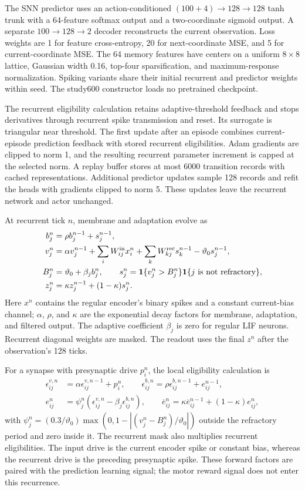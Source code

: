 The SNN predictor uses an action-conditioned $(100+4)\to128\to128$ tanh trunk with a 64-feature softmax output and a two-coordinate sigmoid output. A separate $100\to128\to2$ decoder reconstructs the current observation. Loss weights are 1 for feature cross-entropy, 20 for next-coordinate MSE, and 5 for current-coordinate MSE. The 64 memory features have centers on a uniform $8\times8$ lattice, Gaussian width 0.16, top-four sparsification, and maximum-response normalization. Spiking variants share their initial recurrent and predictor weights within seed. The study600 constructor loads no pretrained checkpoint.

The recurrent eligibility calculation retains adaptive-threshold feedback and stops derivatives through recurrent spike transmission and reset. Its surrogate is triangular near threshold. The first update after an episode combines current-episode prediction feedback with stored recurrent eligibilities. Adam gradients are clipped to norm 1, and the resulting recurrent parameter increment is capped at the selected norm. A replay buffer stores at most 6000 transition records with cached representations. Additional predictor updates sample 128 records and refit the heads with gradients clipped to norm 5. These updates leave the recurrent network and actor unchanged.

At recurrent tick $n$, membrane and adaptation evolve as
\begin{align}
 b_j^n &= \rho b_j^{n-1}+s_j^{n-1},\\
 v_j^n &= \alpha v_j^{n-1}+\sum_i W^{\rm in}_{ij}x_i^n
           +\sum_k W^{\rm rec}_{kj}s_k^{n-1}-\vartheta_0s_j^{n-1},\\
 B_j^n &= \vartheta_0+\beta_j b_j^n,\qquad
 s_j^n=\mathbf1\{v_j^n>B_j^n\}\mathbf1\{j\text{ is not refractory}\},\\
 z_j^n &= \kappa z_j^{n-1}+(1-\kappa)s_j^n.
\end{align}
Here $x^n$ contains the regular encoder's binary spikes and a constant current-bias channel; $\alpha$, $\rho$, and $\kappa$ are the exponential decay factors for membrane, adaptation, and filtered output. The adaptive coefficient $\beta_j$ is zero for regular LIF neurons. Recurrent diagonal weights are masked. The readout uses the final $z^n$ after the observation's 128 ticks.

For a synapse with presynaptic drive $p_i^n$, the local eligibility calculation is
\begin{align}
 \epsilon^{v,n}_{ij}&=\alpha\epsilon^{v,n-1}_{ij}+p_i^n,\qquad
 \epsilon^{b,n}_{ij}=\rho\epsilon^{b,n-1}_{ij}+e^{n-1}_{ij},\\
 e^n_{ij}&=\psi_j^n(\epsilon^{v,n}_{ij}-\beta_j\epsilon^{b,n}_{ij}),\qquad
 \overline e^n_{ij}=\kappa\overline e^{n-1}_{ij}+(1-\kappa)e^n_{ij},
\end{align}
with $\psi_j^n=(0.3/\vartheta_0)\max(0,1-|\left(v_j^n-B_j^n\right)/\vartheta_0|)$ outside the refractory period and zero inside it. The recurrent mask also multiplies recurrent eligibilities. The input drive is the current encoder spike or constant bias, whereas the recurrent drive is the preceding presynaptic spike. These forward factors are paired with the prediction learning signal; the motor reward signal does not enter this recurrence.

